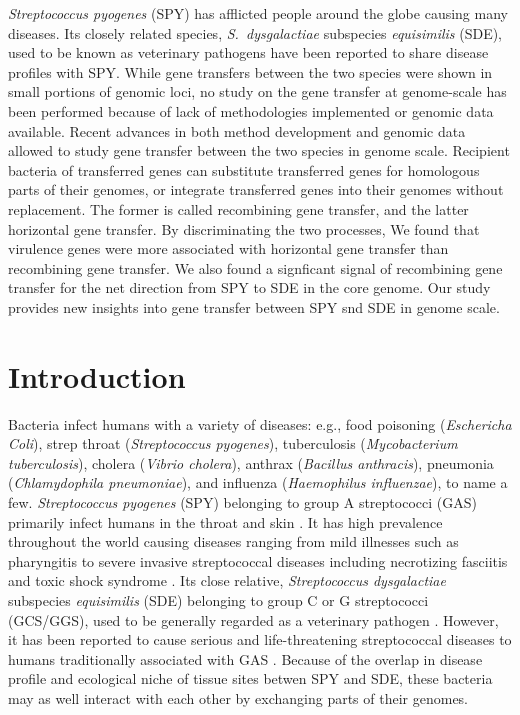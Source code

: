 \documentclass[10pt]{article}
\let\citep\cite
\begin{document}
\textit{Streptococcus pyogenes} (SPY) has afflicted people around the globe
causing many diseases. Its closely related species, \textit{S.\ dysgalactiae}
subspecies \textit{equisimilis} (SDE), used to be known as veterinary pathogens
have been reported to share disease profiles with SPY.  While gene transfers
between the two species were shown in small portions of genomic loci, no study
on the gene transfer at genome-scale has been performed because of lack of
methodologies implemented or genomic data available. Recent advances in both
method development and genomic data allowed to study gene transfer between the
two species in genome scale.  Recipient bacteria of transferred genes can
substitute transferred genes for homologous parts of their genomes, or integrate
transferred genes into their genomes without replacement.  The former is called
recombining gene transfer, and the latter horizontal gene transfer. By
discriminating the two processes, We found that virulence genes were more
associated with horizontal gene transfer than recombining gene transfer.  We
also found a signficant signal of recombining gene transfer for the net
direction from SPY to SDE in the core genome.  Our study provides new insights
into gene transfer between SPY snd SDE in genome scale.  

\section*{Introduction}

Bacteria infect humans with a variety of diseases: e.g., food poisoning
(\textit{Eschericha Coli}), strep throat (\textit{Streptococcus pyogenes}),
tuberculosis (\textit{Mycobacterium tuberculosis}), cholera (\textit{Vibrio
cholera}), anthrax (\textit{Bacillus anthracis}), pneumonia
(\textit{Chlamydophila pneumoniae}), and influenza (\textit{Haemophilus
influenzae}), to name a few.  \textit{Streptococcus pyogenes} (SPY) belonging to
group A streptococci (GAS) primarily infect humans in the throat and skin
\citep{Broyles2009}. It has high prevalence throughout the world causing
diseases ranging from mild illnesses such as pharyngitis to severe invasive
streptococcal diseases including necrotizing fasciitis and toxic shock syndrome
\citep{Cunningham2000a}.  Its close relative, \textit{Streptococcus
dysgalactiae} subspecies \textit{equisimilis} (SDE) belonging to group C or G
streptococci (GCS/GGS), used to be generally regarded as a veterinary pathogen
\citep{Vandamme1996}. However, it has been reported to cause serious and
life-threatening streptococcal diseases to humans traditionally associated with
GAS \citep{Brandt2009}.  Because of the overlap in disease profile and
ecological niche of tissue sites betwen SPY and SDE, these bacteria may as
well interact with each other by exchanging parts of their genomes.  
\end{document}
